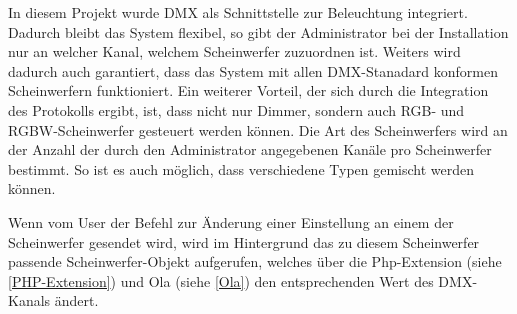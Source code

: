 In diesem Projekt wurde DMX als Schnittstelle zur Beleuchtung
integriert. Dadurch bleibt das System flexibel, so gibt der
Administrator bei der Installation nur an welcher Kanal, welchem
Scheinwerfer zuzuordnen ist. Weiters wird dadurch auch garantiert, dass
das System mit allen DMX-Stanadard konformen Scheinwerfern funktioniert.
Ein weiterer Vorteil, der sich durch die Integration des Protokolls
ergibt, ist, dass nicht nur Dimmer, sondern auch RGB- und
RGBW-Scheinwerfer gesteuert werden können. Die Art des Scheinwerfers
wird an der Anzahl der durch den Administrator angegebenen Kanäle pro
Scheinwerfer bestimmt. So ist es auch möglich, dass verschiedene Typen
gemischt werden können.

Wenn vom User der Befehl zur Änderung einer Einstellung an einem der
Scheinwerfer gesendet wird, wird im Hintergrund das zu diesem
Scheinwerfer passende Scheinwerfer-Objekt aufgerufen, welches über die
Php-Extension (siehe \ref{PHP-Extension}) und Ola (siehe \ref{Ola}) den
entsprechenden Wert des DMX-Kanals ändert.

